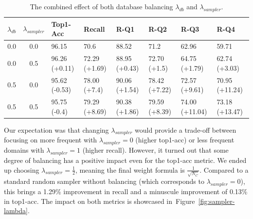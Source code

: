 \documentclass[lettersize,journal,twoside,article]{IEEEtran}
\newcommand{\figref}[1]{Figure~\ref{#1}}
\begin{document}
\begin{table}[t]
    \centering
    \setlength\extrarowheight{1pt}
    \caption{The combined effect of both database balancing  $\lambda_{db}$ and $\lambda_{sampler}$.}
    \label{tab:db-sampler-lambdas}
    \begin{tabular}{|cc|l|l|l|l|l|l|}
        \hline
         $\lambda_{db}$ & $\lambda_{sampler}$ & \textbf{Top1-Acc} & \textbf{Recall} & \textbf{R-Q1} & \textbf{R-Q2} & \textbf{R-Q3} & \textbf{R-Q4} \\ \hline
        0.0 & 0.0 & 96.15                      & 70.6 & 88.52 & 71.2 & 62.96 & 59.71                              \\ \hline
        0.0 & 0.5 & 96.26 \scriptsize{(+0.11)} & 72.29 \scriptsize{(+1.69)} & 88.95 \scriptsize{(+0.43)} & 72.70 \scriptsize{(+1.5)} & 64.75 \scriptsize{(+1.79)} & 62.74 \scriptsize{(+3.03)} \\ \hline
        0.5 & 0.0 & 95.62 \scriptsize{(-0.53)} & 78.00 \scriptsize{(+7.4)} & 90.06 \scriptsize{(+1.54)} & 78.42 \scriptsize{(+7.22)} & 72.57 \scriptsize{(+9.61)} & 70.95 \scriptsize{(+11.24)} \\ \hline
        0.5 & 0.5 & 95.75 \scriptsize{(-0.4)}  & 79.29 \scriptsize{(+8.69)} & 90.38 \scriptsize{(+1.86)} & 79.59 \scriptsize{(+8.39)} & 74.00 \scriptsize{(+11.04)} & 73.18 \scriptsize{(+13.47)} \\ \hline
    \end{tabular}
\end{table}

Our expectation was that changing $\lambda_{sampler}$ would provide a trade-off between focusing on more frequent with $\lambda_{sampler} = 0$ (higher top1-acc) or less frequent domains with $\lambda_{sampler} = 1$ (higher recall). However, it turned out that some degree of balancing has a positive impact even for the top1-acc metric. We ended up choosing $\lambda_{sampler} = \frac{1}{2}$, meaning the final weight formula is $\frac{1}{\sqrt{N_C}}$. Compared to a standard random sampler without balancing (which corresponds to $\lambda_{sampler} = 0$), this brings a 1.29\% improvement in recall and a minuscule improvement of 0.13\% in top1-acc. The impact on both metrics is showcased in~\figref{fig:sampler-lambda}.
\end{document}
